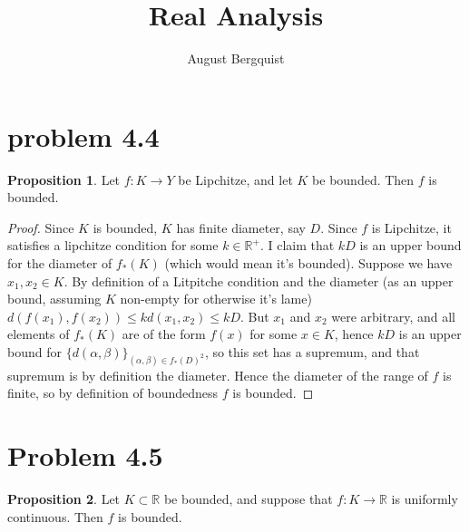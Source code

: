 \documentclass[11pt]{article}
\title{Real Analysis}
\author{August Bergquist}
\newcommand{\R}{\mathbb{R}}
\theoremstyle{definition}
\newtheorem{proposition}{Proposition}
\begin{document}
\maketitle

\section{problem 4.4}

\begin{proposition}
Let $f:K\to Y$ be Lipchitze, and let $K$ be bounded. Then $f$ is bounded.
\end{proposition}

\begin{proof}
Since $K$ is bounded, $K$ has finite diameter, say $D$. Since $f$ is Lipchitze, it satisfies a lipchitze condition for some $k\in \R^+$. I claim that $kD$ is an upper bound for the diameter of $f_*(K)$ (which would mean it's bounded). Suppose we have $x_1,x_2\in K$. By definition of a Litpitche condition and the diameter (as an upper bound, assuming $K$ non-empty for otherwise it's lame) $d(f(x_1), f(x_2) ) \le  kd(x_1, x_2) \le kD$. But $x_1$ and $x_2$ were arbitrary, and all elements of $f_*(K)$ are of the form $f(x)$ for some $x\in K$, hence $kD$ is an upper bound for $\{d(\alpha,\beta)\}_{(\alpha,\beta)\in f_*(D)^2}$, so this set has a supremum, and that supremum is by definition the diameter. Hence the diameter of the range of $f$ is finite, so by definition of boundedness $f$ is bounded.
\end{proof}

\section{Problem 4.5}

\begin{proposition}
Let $K\subset \R$ be bounded, and suppose that $f:K\to \R$ is uniformly continuous. Then $f$ is bounded. 
\end{proposition}
\end{document}
